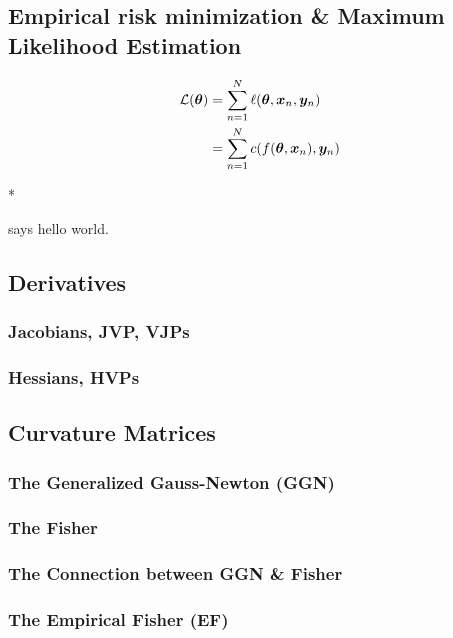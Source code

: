 \subsection{Empirical risk minimization \& Maximum Likelihood Estimation}

\begin{paracol}{2}

  \begin{align}
    {\mathcal{L}}({\bm{\theta}}) &= \sum_{n=1}^N \ell({\bm{\theta}}, {\bm{x}}_n, {\bm{y}}_n)
    \\
                 &=
                   \sum_{n=1}^N c(f({\bm{\theta}}, {\bm{x}}_n), {\bm{y}}_n)
  \end{align}

  \switchcolumn[0]

  \blindtext

  \switchcolumn[1]

  \switchcolumn[0]* %

  \blindtext

  \switchcolumn[1]


  \switchcolumn[0]

   says hello world.

\end{paracol}

\subsection{Derivatives}
\subsubsection{Jacobians, JVP, VJPs}
\subsubsection{Hessians, HVPs}

\subsection{Curvature Matrices}
\subsubsection{The Generalized Gauss-Newton (GGN)}
\subsubsection{The Fisher}
\subsubsection{The Connection between GGN \& Fisher}
\subsubsection{The Empirical Fisher (EF)}

